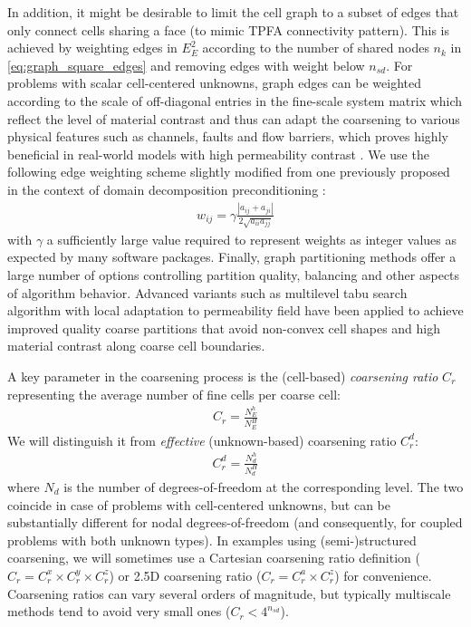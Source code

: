 \begin{itemize}
    In addition, it might be desirable to limit the cell graph to a subset of edges that only connect cells sharing a face (to mimic TPFA connectivity pattern).   This is achieved by weighting edges in $E_E^2$ according to the number of shared nodes $n_k$ in \cref{eq:graph_square_edges} and removing edges with weight below $n_{sd}$.   For problems with scalar cell-centered unknowns, graph edges can be weighted according to the scale of off-diagonal entries in the fine-scale system matrix which reflect the level of material contrast and thus can adapt the coarsening to various physical features such as channels, faults and flow barriers, which proves highly beneficial in real-world models with high permeability contrast \cite{Klemetsdal2020}.   We use the following edge weighting scheme slightly modified from one previously proposed in the context of domain decomposition preconditioning \cite{Vecharynski2014}:
    \begin{align}
        w_{ij} = \gamma \frac{|a_{ij} + a_{ji}|}{2\sqrt{a_{ii} a_{jj}}} \label{eq:graph_matrix_weights}
    \end{align}
    with $\gamma$ a sufficiently large value required to represent weights as integer values as expected by many software packages.    Finally, graph partitioning methods offer a large number of options controlling partition quality, balancing and other aspects of algorithm behavior.   Advanced variants such as multilevel tabu search algorithm with local adaptation to permeability field \cite{Mehrdoost2019} have been applied to achieve improved quality coarse partitions that avoid non-convex cell shapes and high material contrast along coarse cell boundaries.
\end{itemize}

A key parameter in the coarsening process is the (cell-based) \textit{coarsening ratio} $C_r$ representing the average number of fine cells per coarse cell:
\begin{align}
    C_r = \frac{N_E^h}{N_E^H}
\end{align}
We will distinguish it from \textit{effective} (unknown-based) coarsening ratio $C_r^d$:
\begin{align}
    C_r^d = \frac{N_d^h}{N_d^H}
\end{align}
where $N_d$ is the number of degrees-of-freedom at the corresponding level. The two coincide in case of problems with cell-centered unknowns, but can be substantially different for nodal degrees-of-freedom (and consequently, for coupled problems with both unknown types). In examples using (semi-)structured coarsening, we will sometimes use a Cartesian coarsening ratio definition ($C_r = C_r^x \times C_r^y \times C_r^z$) or 2.5D coarsening ratio ($C_r = C_r^a \times C_r^z$) for convenience. Coarsening ratios can vary several orders of magnitude, but typically multiscale methods tend to avoid very small ones ($C_r < 4^{n_{sd}}$).

